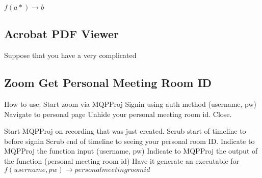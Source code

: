 $f(a*) \to b$

\subsection{Acrobat PDF Viewer}
Suppose that you have a very complicated 

\subsection{Zoom Get Personal Meeting Room ID}

How to use: 
Start zoom via MQPProj
Signin using auth method (username, pw)
Navigate to personal page
Unhide your personal meeting room id. 
Close.

Start MQPProj on recording that was just created. 
Scrub start of timeline to before signin 
Scrub end of timeline to seeing your personal room ID.
Indicate to MQPProj the function input (username, pw)
Indicate to MQPProj the output of the function (personal meeting room id)
Have it generate an executable for $f(username,pw) \to personal meeting room id$


